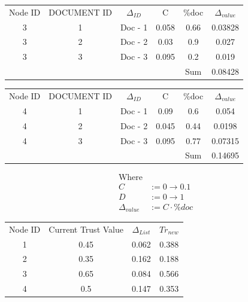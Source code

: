 \begin{tabular}{c c c c c c}
Node ID &	DOCUMENT ID	&  \( \Delta_{ID} \)         & C	& \%doc	& \( \Delta_{value} \)
\\
3        &1	  & Doc - 1         & 0.058      & 0.66	& 0.03828 \\
3        &2	  & Doc - 2         & 0.03       & 0.9	& 0.027 \\
3        &3	  & Doc - 3         & 0.095      & 0.2	& 0.019 \\
      	 & 	  &                 &            & Sum	& 0.08428
\end{tabular}

\begin{tabular}{c c c c c c}
Node ID &	DOCUMENT ID	&  \( \Delta_{ID} \)         & C	& \%doc	 & \( \Delta_{value} \)
\\
4        &1	  & Doc - 1         & 0.09       & 0.6	& 0.054 \\
4        &2	  & Doc - 2         & 0.045      & 0.44	& 0.0198 \\
4        &3	  & Doc - 3         & 0.095      & 0.77	& 0.07315 \\
	     &    &                 &            &	Sum	& 0.14695
\end{tabular}

\begin{align*}
    \text{Where}& \\
    C &:= 0 \to 0.1 \\
    D &:= 0 \to 1 \\
    \Delta_{value} &:= C \cdot \%doc
\end{align*}

\begin{tabular}{c c c c}
    Node ID	& Current Trust Value &	\( \Delta_{List} \) & \( Tr_{new} \)  \\
1       & 0.45                & 0.062    &    0.388 \\
2       & 0.35                & 0.162    &    0.188 \\
3       & 0.65                & 0.084    &    0.566 \\
4       & 0.5                 & 0.147    &    0.353 \\
\end{tabular}

